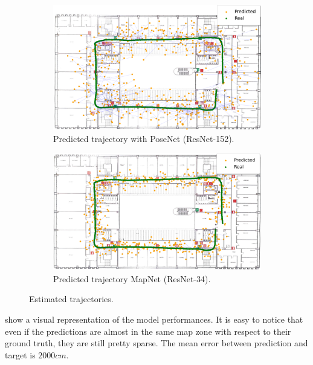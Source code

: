 \begin{figure}[htbp]
    \begin{subfigure}[b]{0.48\textwidth}
        \centering
        \includegraphics[width=1\textwidth]{./imgs/posenet_map.png}
        \caption{Predicted trajectory with PoseNet (ResNet-152).}
        \label{fig:trajectory-posenet}
    \end{subfigure}
    \hfill
    \begin{subfigure}[b]{0.48\textwidth}
        \includegraphics[width=1\textwidth]{./imgs/mapnet_map.png}
        \caption{Predicted trajectory MapNet (ResNet-34).}
        \label{fig:trajectory-mapnet}
    \end{subfigure}
    \caption{Estimated trajectories.}
\end{figure}
 show a visual representation of the model performances. It is easy to notice that even if the predictions are almost in the same map zone with respect to their ground truth, they are still pretty sparse. The mean error between prediction and target is $2000 cm$.

